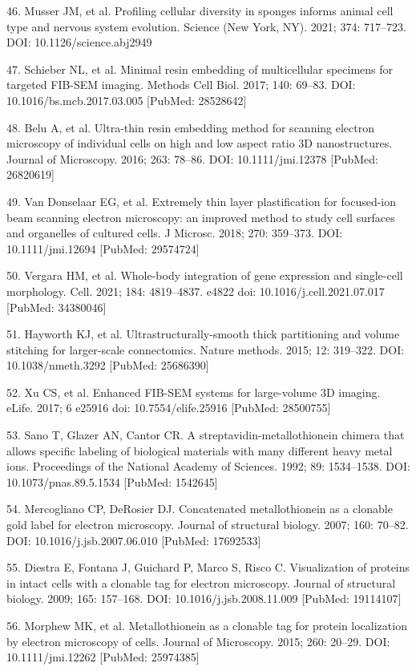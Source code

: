 \documentclass{article}
\begin{document}
\begin{hangpars}
46. Musser JM, et al. Profiling cellular diversity in sponges informs animal cell type and nervous system evolution. Science (New York, NY). 2021; 374: 717–723. DOI: 10.1126/science.abj2949

47. Schieber NL, et al. Minimal resin embedding of multicellular specimens for targeted FIB-SEM imaging. Methods Cell Biol. 2017; 140: 69–83. DOI: 10.1016/bs.mcb.2017.03.005 [PubMed: 28528642]

48. Belu A, et al. Ultra-thin resin embedding method for scanning electron microscopy of individual cells on high and low aspect ratio 3D nanostructures. Journal of Microscopy. 2016; 263: 78–86. DOI: 10.1111/jmi.12378 [PubMed: 26820619]

49. Van Donselaar EG, et al. Extremely thin layer plastification for focused-ion beam scanning electron microscopy: an improved method to study cell surfaces and organelles of cultured cells. J Microsc. 2018; 270: 359–373. DOI: 10.1111/jmi.12694 [PubMed: 29574724]

50. Vergara HM, et al. Whole-body integration of gene expression and single-cell morphology. Cell. 2021; 184: 4819–4837. e4822 doi: 10.1016/j.cell.2021.07.017 [PubMed: 34380046]

51. Hayworth KJ, et al. Ultrastructurally-smooth thick partitioning and volume stitching for larger-scale connectomics. Nature methods. 2015; 12: 319–322. DOI: 10.1038/nmeth.3292 [PubMed: 25686390]

52. Xu CS, et al. Enhanced FIB-SEM systems for large-volume 3D imaging. eLife. 2017; 6 e25916 doi: 10.7554/elife.25916 [PubMed: 28500755]

53. Sano T, Glazer AN, Cantor CR. A streptavidin-metallothionein chimera that allows specific labeling of biological materials with many different heavy metal ions. Proceedings of the National Academy of Sciences. 1992; 89: 1534–1538. DOI: 10.1073/pnas.89.5.1534 [PubMed: 1542645]

54. Mercogliano CP, DeRosier DJ. Concatenated metallothionein as a clonable gold label for electron microscopy. Journal of structural biology. 2007; 160: 70–82. DOI: 10.1016/j.jsb.2007.06.010 [PubMed: 17692533]

55. Diestra E, Fontana J, Guichard P, Marco S, Risco C. Visualization of proteins in intact cells with a clonable tag for electron microscopy. Journal of structural biology. 2009; 165: 157–168. DOI: 10.1016/j.jsb.2008.11.009 [PubMed: 19114107]

56. Morphew MK, et al. Metallothionein as a clonable tag for protein localization by electron microscopy of cells. Journal of Microscopy. 2015; 260: 20–29. DOI: 10.1111/jmi.12262 [PubMed: 25974385]


\end{hangpars}
\end{document}

